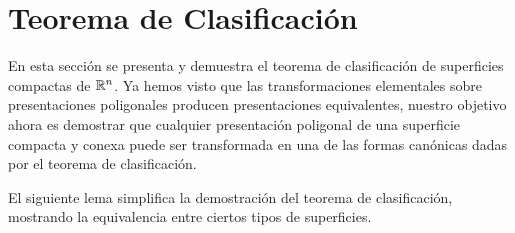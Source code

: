 
\clearpage

\section{Teorema de Clasificación}

En esta sección se presenta y demuestra el teorema de clasificación de superficies compactas de $\mathbb{R} ^n$. Ya hemos visto que las transformaciones elementales sobre presentaciones poligonales producen presentaciones equivalentes, nuestro objetivo ahora es demostrar que cualquier presentación poligonal de una superficie compacta y conexa puede ser transformada en una de las formas canónicas dadas por el teorema de clasificación.

El siguiente lema simplifica la demostración del teorema de clasificación, mostrando la equivalencia entre ciertos tipos de superficies.

